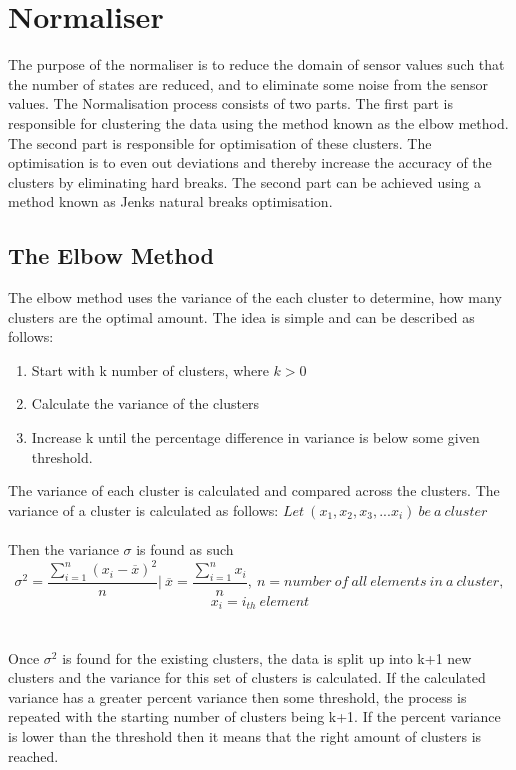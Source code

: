 \section{Normaliser}
\label{sec:normaliser}
The purpose of the normaliser is to reduce the domain of sensor values such that the number of states are reduced, and to eliminate some noise from the sensor values. The Normalisation process consists of two parts. The first part is responsible for clustering the data using the method known as the elbow method. The second part is responsible for optimisation of these clusters. The optimisation is to even out deviations and thereby increase the accuracy of the clusters by eliminating hard breaks. The second part can be achieved using a method known as Jenks natural breaks optimisation.

\subsection{The Elbow Method}
\label{sub:elbow_method}
The elbow method uses the variance of the each cluster to determine, how many clusters are the optimal amount. The idea is simple and can be described as follows:
\begin{enumerate}
\item Start with k number of clusters, where $k>0$
\item Calculate the variance of the clusters
\item Increase k until the percentage difference in variance is below some given threshold.
\end{enumerate}
The variance of each cluster is calculated and compared across the clusters. The variance of a cluster is calculated as follows:
$Let\ (x_1,x_2,x_3,...x_i) \ be \ a\ cluster $
\\\\Then the variance $\sigma$ is found as such
$$\sigma^2 = \frac{\displaystyle\sum_{i = 1}^{n}(x_{i}-\overline{x})^2 }{n} \Biggr\rvert\ \overline{x}  =\frac{\displaystyle\sum_{i=1}^{n}x_{i}}{n},\ n =number\ of\ all\ elements\ in\ a\ cluster ,$$ 
$$ x_{i} = i_{th}\ element $$
\\\\
Once $\sigma^2$ is found for the existing clusters, the data is split up into k+1 new clusters and the variance for this set of clusters is calculated. If the calculated variance has a greater percent variance then some threshold, the process is repeated with the starting number of clusters being k+1. If the percent variance is lower than the threshold then it means that the right amount of clusters is reached.
